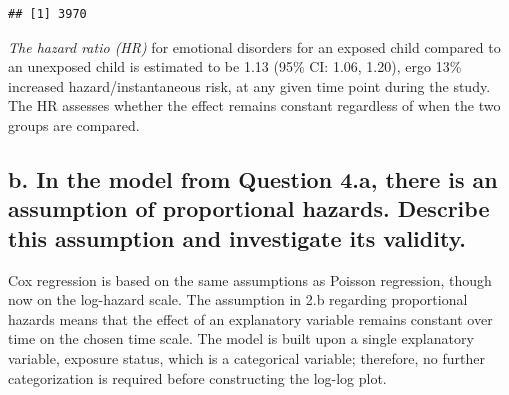 \documentclass[
]{article}
\begin{document}
\begin{verbatim}
## [1] 3970
\end{verbatim}

\emph{The hazard ratio (HR)} for emotional disorders for an exposed
child compared to an unexposed child is estimated to be 1.13 (95\% CI:
1.06, 1.20), ergo 13\% increased hazard/instantaneous risk, at any given
time point during the study. The HR assesses whether the effect remains
constant regardless of when the two groups are compared.

\subsection{b. In the model from Question 4.a, there is an assumption of
proportional hazards. Describe this assumption and investigate its
validity.}\label{b.-in-the-model-from-question-4.a-there-is-an-assumption-of-proportional-hazards.-describe-this-assumption-and-investigate-its-validity.}

Cox regression is based on the same assumptions as Poisson regression,
though now on the log-hazard scale. The assumption in 2.b regarding
proportional hazards means that the effect of an explanatory variable
remains constant over time on the chosen time scale. The model is built
upon a single explanatory variable, exposure status, which is a
categorical variable; therefore, no further categorization is required
before constructing the log-log plot.
\end{document}
